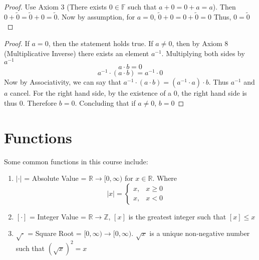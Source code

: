 \documentclass[a4paper, notitlepage]{report}
\newtheorem{theorem}{Theorem}
\theoremstyle{remark}
\theoremstyle{definition}
\begin{document}
            \begin{proof}
                Use Axiom 3 (There exists $0\in \mathbb{F}$ such that $a+0 = 0+a = a$). Then $0 + \tilde{0} = \tilde{0} + 0 = \tilde{0}$. Now by assumption, for $a=0$, $\tilde{0} + 0 = 0 + \tilde{0} = 0$
                Thus, $0=\tilde{0}$ 

            \end{proof}
           \begin{center}
           \end{center} 
           \begin{proof}
                If $a=0$, then the statement holds true.  If $a \neq 0$, then by Axiom 8 (Multiplicative Inverse) there exists an element $a^{-1}$. Multiplying both sides by $a^{-1}$
                $$a\cdot b = 0$$
                $$a^{-1} \cdot (a \cdot b) = a^{-1} \cdot 0$$
                Now by Associativity, we can say that $a^{-1}\cdot (a \cdot b) = (a^{-1} \cdot a) \cdot b$. Thus $a^{-1}$ and $a$ cancel.
                For the right hand side, by the existence of a 0, the right hand side is thus 0. Therefore $b = 0$. Concluding that if $a \neq 0$, $b = 0$
                
            \end{proof}

            \section{Functions}
            Some common functions in this course include:
            \begin{enumerate}
                \item $| \cdot |$ = Absolute Value = $\mathbb{R} \rightarrow [0, \infty)$ for $x \in \mathbb{R}$. Where 
                \[  |x| = 
                    \begin{cases}
                        x, & x \geq 0 \\
                        x, & x < 0 
                    \end{cases}
                \]

                \item $[\cdot ]$ = Integer Value = $\mathbb{R} \rightarrow \mathbb{Z}$, $[x]$ is the greatest integer such that $[x] \leq x$ 
                \item $\sqrt{\cdot}$ = Square Root = $[0,\infty) \rightarrow [0, \infty)$. $\sqrt{x}$ is a unique non-negative number such that $(\sqrt{x})^2 = x$
            \end{enumerate}
\end{document}

